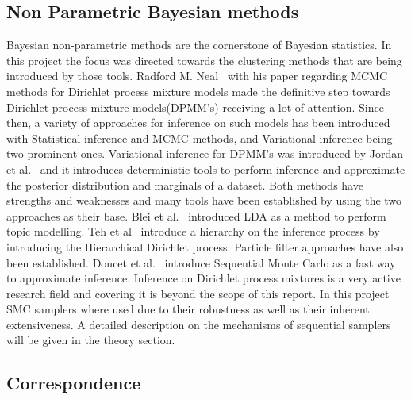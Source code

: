 \documentclass[twoside,hidelinks]{article}
\begin{document}
\subsection{Non Parametric Bayesian methods}

Bayesian non-parametric methods are the cornerstone of Bayesian statistics. In this project the focus was directed towards the clustering methods that are being introduced by those tools. Radford M. Neal~\cite{bayes:neal} with his paper regarding MCMC methods for Dirichlet process mixture models made the definitive step towards Dirichlet process mixture models(DPMM's) receiving a lot of attention. Since then, a variety of approaches for inference on such models has been introduced with Statistical inference and MCMC methods, and Variational inference being two prominent ones. Variational inference for DPMM's was introduced by Jordan et al.~\cite{bayes:jordan} and it introduces deterministic tools to perform inference and approximate the posterior distribution and marginals of a dataset. Both methods have strengths and weaknesses and many tools have been established by using the two approaches as their base. Blei et al.~\cite{LDA} introduced LDA as a method to perform topic modelling. Teh et al~\cite{bayes:hier} introduce a hierarchy on the inference process by introducing the Hierarchical Dirichlet process. Particle filter approaches have also been established. Doucet et al.~\cite{bayes:smc} introduce Sequential Monte Carlo as a fast way to approximate inference. Inference on Dirichlet process mixtures is a very active research field and covering it is beyond the scope of this report. In this project SMC samplers where used due to their robustness as well as their inherent extensiveness. A detailed description on the mechanisms of sequential samplers will be given in the theory section.

\subsection{Correspondence}
\end{document}
